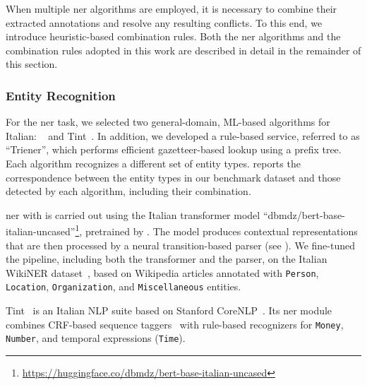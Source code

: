 
When multiple \ac{ner} algorithms are employed, it is necessary to combine their extracted annotations and resolve any resulting conflicts. To this end, we introduce heuristic-based combination rules. Both the \ac{ner} algorithms and the combination rules adopted in this work are described in detail in the remainder of this section.








\subsubsection{Entity Recognition}          
For the \ac{ner} task, we selected two general-domain, ML-based algorithms for Italian: \spacy~\cite{honnibal2020spacy} and Tint~\cite{2018tint2}. 
In addition, we developed a rule-based service, referred to as ``Trie\ac{ner}'', which performs efficient gazetteer-based lookup using a prefix tree.  
Each algorithm recognizes a different set of entity types.  reports the correspondence between the entity types in our benchmark dataset and those detected by each algorithm, including their combination.  

\ac{ner} with \spacy is carried out using the Italian transformer model ``dbmdz/bert-base-italian-uncased''\footnote{\url{https://huggingface.co/dbmdz/bert-base-italian-uncased}}, pretrained by \textcite{stefan_schweter_2020_4263142}.  
The model produces contextual representations that are then processed by a neural transition-based parser (see ).  
We fine-tuned the \spacy pipeline, including both the transformer and the parser, on the Italian WikiNER dataset~\cite{NOTHMAN2013151}, based on Wikipedia articles annotated with \texttt{Person}, \texttt{Location}, \texttt{Organization}, and \texttt{Miscellaneous} entities.

Tint~\cite{2018tint2} is an Italian NLP suite based on Stanford CoreNLP~\cite{manning-EtAl:2014:P14-5}.  
Its \ac{ner} module combines CRF-based sequence taggers~\cite{Lafferty2001} with rule-based recognizers for \texttt{Money}, \texttt{Number}, and temporal expressions (\texttt{Time}).

